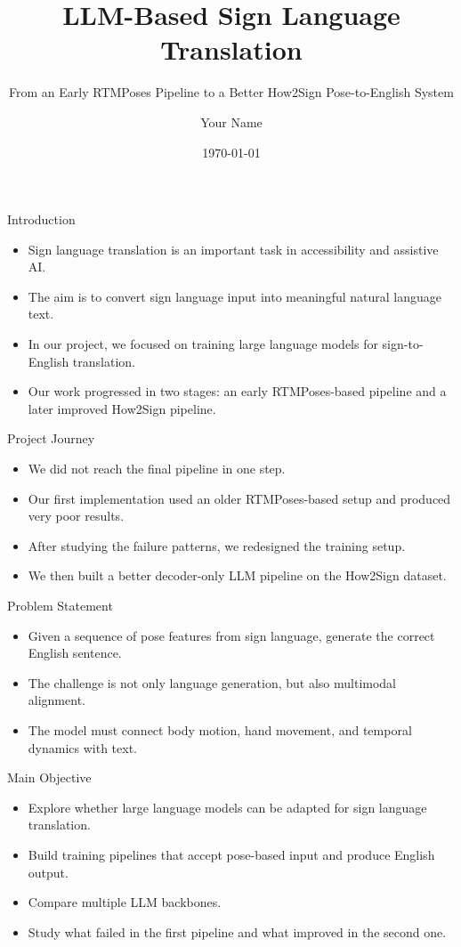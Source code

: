 \documentclass[aspectratio=169]{beamer}
\title{LLM-Based Sign Language Translation}
\subtitle{From an Early RTMPoses Pipeline to a Better How2Sign Pose-to-English System}
\author{Your Name}
\institute{Your Department / College}
\date{\today}
\begin{document}
\begin{frame}
  \titlepage
\end{frame}

\begin{frame}{Introduction}
\begin{itemize}
  \item Sign language translation is an important task in accessibility and assistive AI.
  \item The aim is to convert sign language input into meaningful natural language text.
  \item In our project, we focused on training large language models for sign-to-English translation.
  \item Our work progressed in two stages: an early RTMPoses-based pipeline and a later improved How2Sign pipeline.
\end{itemize}
\end{frame}

\begin{frame}{Project Journey}
\begin{itemize}
  \item We did not reach the final pipeline in one step.
  \item Our first implementation used an older RTMPoses-based setup and produced very poor results.
  \item After studying the failure patterns, we redesigned the training setup.
  \item We then built a better decoder-only LLM pipeline on the How2Sign dataset.
\end{itemize}
\end{frame}

\begin{frame}{Problem Statement}
\begin{itemize}
  \item Given a sequence of pose features from sign language, generate the correct English sentence.
  \item The challenge is not only language generation, but also multimodal alignment.
  \item The model must connect body motion, hand movement, and temporal dynamics with text.
\end{itemize}
\end{frame}

\begin{frame}{Main Objective}
\begin{itemize}
  \item Explore whether large language models can be adapted for sign language translation.
  \item Build training pipelines that accept pose-based input and produce English output.
  \item Compare multiple LLM backbones.
  \item Study what failed in the first pipeline and what improved in the second one.
\end{itemize}
\end{frame}
\end{document}
